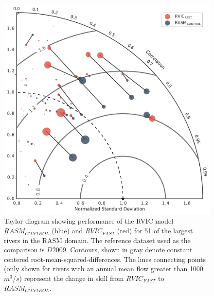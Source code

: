\documentclass[jgrga, draft]{agutex}
\begin{document}
\clearpage
\begin{figure}
\noindent\includegraphics[width=40pc,natwidth=1]{R1010RBRbaaa01a_rvicfast_taylordiag}
\caption{Taylor diagram showing performance of the RVIC model $RASM_{CONTROL}$ (blue) and $RVIC_{FAST}$ (red) for 51 of the largest rivers in the RASM domain.
The reference dataset used as the comparison is $D2009$.
Contours, shown in gray denote constant centered root-mean-squared-differences.
The lines connecting points (only shown for rivers with an annual mean flow greater than 1000 $m^3/s$) represent the change in skill from $RVIC_{FAST}$ to $RASM_{CONTROL}$.
}
\label{fig:taylor}
\end{figure}
\end{document}
